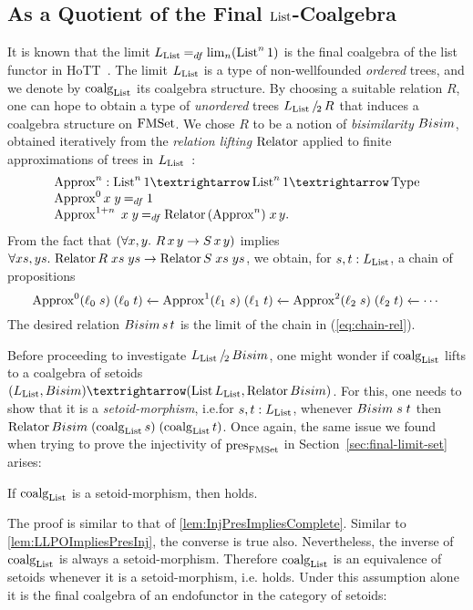 \documentclass[a4paper,USenglish,cleveref]{lipics-v2021}
\begin{document}
\subsection{As a Quotient of the Final $\List$-Coalgebra}\label{sec:final-quotient-set}

It is known that the limit $\Lim{\List} \DefEq \lim_n (\List^n 1)$ is the final coalgebra of the list functor in HoTT~\cite{Ahrens2015}.
The limit $\Lim{\List}$ is a type of non-wellfounded \emph{ordered} trees,
and we denote by $\coalg{\List}$ its coalgebra structure.
By choosing a suitable relation $R$, one can hope to obtain a type of
\emph{unordered} trees $\SetQuot[\Lim{\List}][R]$ that induces a coalgebra structure on $\FMSet$.
We chose $R$ to be a notion of \emph{bisimilarity} $\Bisim$,
obtained iteratively from the \emph{relation lifting} $\Relator$ applied to finite approximations of trees in $\Lim{\List}$~\cite{Hasuo2013}:
\[
\begin{array}{l}
  \Approx^n : \List^n 1 → \List^n 1 → \Type \\
  \Approx^0 x\;y \DefEq 1 \\
  \Approx^{1+n}\;x\;y \DefEq \Relator \,(\Approx^n)\;x\,y.
\end{array}
\]
From the fact that $(\forall x,y\mathpunct{.}\, R \,x\,y \to S \,x\,y)$ implies $\forall xs,ys \Where \Relator  R\;xs\;ys \to \Relator S\;xs\;ys$,
we obtain, for $s, t : \Lim{\List}$, a chain of propositions
\begin{equation}\label{eq:chain-rel}
  \Approx^0 (\ell_0\; s)\; (\ell_0\; t)
    \xleftarrow{} {\Approx^1 (\ell_1\; s)\; (\ell_1\; t)}
    \xleftarrow{} {\Approx^2 (\ell_2\; s)\; (\ell_2\; t)}
    \xleftarrow{} %
      \cdots
\end{equation}
The desired relation $\Bisim\,s\,t$ is the limit of the chain in (\ref{eq:chain-rel}).

Before proceeding to investigate $\SetQuot[\Lim{\List}][\Bisim]$,
one might wonder if $\coalg{\List}$ lifts to a coalgebra of setoids $(\Lim{\List}, \Bisim) → (\List \Lim{\List}, \Relator \Bisim)$.
For this, one needs to show that it is a \emph{setoid-morphism},
i.e.\@ for $s, t : \Lim{\List}$, whenever $\Bisim\;s\;t$
then $\Relator \Bisim\; (\coalg{\List} s)\; (\coalg{\List} t)$.
Once again, the same issue we found when trying to prove the injectivity of $\pres{\FMSet}$ in Section~\ref{sec:final-limit-set} arises:

\begin{theorem}
  If $\coalg{\List}$ is a setoid-morphism, then \LLPO{} holds.
\end{theorem}
The proof is similar to that of \cref{lem:InjPresImpliesComplete}.
Similar to \cref{lem:LLPOImpliesPresInj}, the converse is true also.
Nevertheless, the inverse of $\coalg{\List}$ is always a setoid-morphism.
Therefore $\coalg{\List}$ is an equivalence of setoids whenever it is a setoid-morphism,
i.e.\@ \LLPO{} holds.
Under this assumption alone it is the final coalgebra of an endofunctor in the category of setoids:
\end{document}
